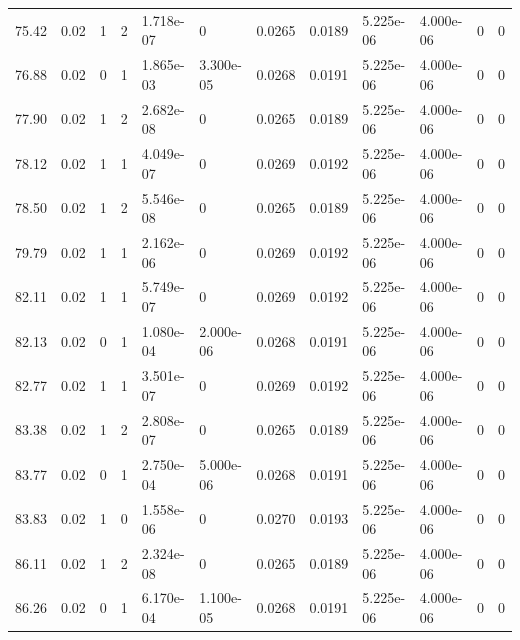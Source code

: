 \documentclass[preview]{standalone}
\begin{document}
{{{\begin{tabular}{L{1.2cm}C{1.2cm} C{0.3cm}C{0.5cm} C{1.4cm}C{1.4cm} C{1.4cm}C{1.4cm} C{1.6cm}C{1.6cm} C{1.6cm}C{1.6cm}}
  75.42  &  0.02  & 1     &  2 &  1.718e-07  & 0  &  0.0265&   0.0189& 5.225e-06 & 4.000e-06   &  0 & 0  \\ 
  76.88  &  0.02  & 0     &  1 &  1.865e-03  & 3.300e-05  &  0.0268&   0.0191& 5.225e-06 & 4.000e-06   &  0 & 0  \\ 
  77.90  &  0.02  & 1     &  2 &  2.682e-08  & 0  &  0.0265&   0.0189& 5.225e-06 & 4.000e-06   &  0 & 0  \\ 
  78.12  &  0.02  & 1     &  1 &  4.049e-07  & 0  &  0.0269&   0.0192& 5.225e-06 & 4.000e-06   &  0 & 0  \\ 
  78.50  &  0.02  & 1     &  2 &  5.546e-08  & 0  &  0.0265&   0.0189& 5.225e-06 & 4.000e-06   &  0 & 0  \\ 
  79.79  &  0.02  & 1     &  1 &  2.162e-06  & 0  &  0.0269&   0.0192& 5.225e-06 & 4.000e-06   &  0 & 0  \\ 
  82.11  &  0.02  & 1     &  1 &  5.749e-07  & 0  &  0.0269&   0.0192& 5.225e-06 & 4.000e-06   &  0 & 0  \\ 
  82.13  &  0.02  & 0     &  1 &  1.080e-04  & 2.000e-06  &  0.0268&   0.0191& 5.225e-06 & 4.000e-06   &  0 & 0  \\ 
  82.77  &  0.02  & 1     &  1 &  3.501e-07  & 0  &  0.0269&   0.0192& 5.225e-06 & 4.000e-06   &  0 & 0  \\ 
  83.38  &  0.02  & 1     &  2 &  2.808e-07  & 0  &  0.0265&   0.0189& 5.225e-06 & 4.000e-06   &  0 & 0  \\ 
  83.77  &  0.02  & 0     &  1 &  2.750e-04  & 5.000e-06  &  0.0268&   0.0191& 5.225e-06 & 4.000e-06   &  0 & 0  \\ 
  83.83  &  0.02  & 1     &  0 &  1.558e-06  & 0  &  0.0270&   0.0193& 5.225e-06 & 4.000e-06   &  0 & 0  \\ 
  86.11  &  0.02  & 1     &  2 &  2.324e-08  & 0  &  0.0265&   0.0189& 5.225e-06 & 4.000e-06   &  0 & 0  \\ 
  86.26  &  0.02  & 0     &  1 &  6.170e-04  & 1.100e-05  &  0.0268&   0.0191& 5.225e-06 & 4.000e-06   &  0 & 0  \\ 
\hline 
\end{tabular} 

}}}
\end{document}
